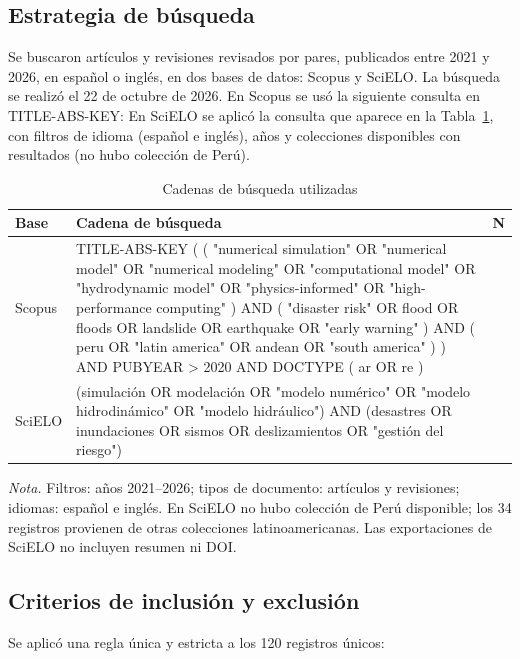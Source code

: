 \documentclass[12pt,a4paper]{article}
\begin{document}
\subsection{Estrategia de búsqueda}
Se buscaron artículos y revisiones revisados por pares, publicados entre 2021 y 2026, en español o inglés, en dos bases de datos: Scopus y SciELO. La búsqueda se realizó el 22 de octubre de 2026. En Scopus se usó la siguiente consulta en TITLE-ABS-KEY:
En SciELO se aplicó la consulta que aparece en la Tabla~\ref{tab:queries}, con filtros de idioma (español e inglés), años y colecciones disponibles con resultados (no hubo colección de Perú).

\begin{table}[ht]
  \centering
  \caption{Cadenas de búsqueda utilizadas}
  \label{tab:queries}
  \begin{tabularx}{\textwidth}{@{}p{2.1cm}>{\raggedright\arraybackslash\ttfamily\small}X>{\centering\arraybackslash}p{1.1cm}@{}}
    \toprule
    Base & Cadena de búsqueda & N \\
    \midrule
    Scopus & TITLE-ABS-KEY ( ( "numerical simulation" OR "numerical model" OR "numerical modeling" OR "computational model" OR "hydrodynamic model" OR "physics-informed" OR "high-performance computing" ) AND ( "disaster risk" OR flood OR floods OR landslide OR earthquake OR "early warning" ) AND ( peru OR "latin america" OR andean OR "south america" ) ) AND PUBYEAR > 2020 AND DOCTYPE ( ar OR re ) & 86 \\
    SciELO & (simulación OR modelación OR "modelo numérico" OR "modelo hidrodinámico" OR "modelo hidráulico") AND (desastres OR inundaciones OR sismos OR deslizamientos OR "gestión del riesgo") & 34 \\
    \bottomrule
  \end{tabularx}
  \par\smallskip\noindent\small\textit{Nota.} Filtros: años 2021--2026; tipos de documento: artículos y revisiones; idiomas: español e inglés. En SciELO no hubo colección de Perú disponible; los 34 registros provienen de otras colecciones latinoamericanas. Las exportaciones de SciELO no incluyen resumen ni DOI.
\end{table}

\subsection{Criterios de inclusión y exclusión}
Se aplicó una regla única y estricta a los 120 registros únicos:
\end{document}
